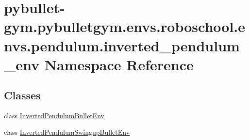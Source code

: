 \hypertarget{namespacepybullet-gym_1_1pybulletgym_1_1envs_1_1roboschool_1_1envs_1_1pendulum_1_1inverted__pendulum__env}{}\section{pybullet-\/gym.pybulletgym.\+envs.\+roboschool.\+envs.\+pendulum.\+inverted\+\_\+pendulum\+\_\+env Namespace Reference}
\label{namespacepybullet-gym_1_1pybulletgym_1_1envs_1_1roboschool_1_1envs_1_1pendulum_1_1inverted__pendulum__env}
\subsection*{Classes}
\begin{DoxyCompactItemize}
\item 
class \hyperlink{classpybullet-gym_1_1pybulletgym_1_1envs_1_1roboschool_1_1envs_1_1pendulum_1_1inverted__pendulum31d47d8094f7022182666018f100e6e7}{Inverted\+Pendulum\+Bullet\+Env}
\item 
class \hyperlink{classpybullet-gym_1_1pybulletgym_1_1envs_1_1roboschool_1_1envs_1_1pendulum_1_1inverted__pendulum31fc9ccf12e9f4ec80aa8e0d61d78e8e}{Inverted\+Pendulum\+Swingup\+Bullet\+Env}
\end{DoxyCompactItemize}

